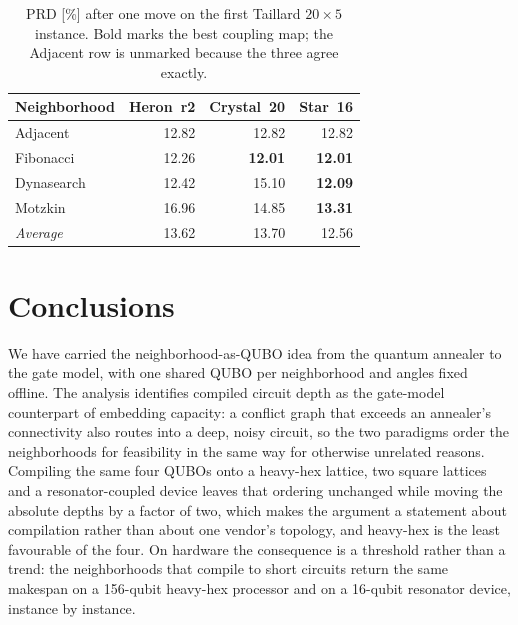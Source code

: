 \documentclass{svproc}
\newcommand{\rev}[1]{{\color{blue}#1}}
\newcommand{\rev}[1]{#1}
\begin{document}
\begin{table}[htb]
\centering
\caption{PRD [\%] after one move on the first Taillard $20\times5$ instance.
  Bold marks the best coupling map; the Adjacent row is unmarked because the
  three agree exactly.}
\label{tab:arch}
\footnotesize
\begin{tabular*}{\textwidth}{@{\extracolsep{\fill}}lrrr@{}}
\toprule
Neighborhood & Heron~r2 & Crystal~20 & Star~16 \\
\midrule
Adjacent    & 12.82 & 12.82 & 12.82 \\
Fibonacci   & 12.26 & \textbf{12.01} & \textbf{12.01} \\
Dynasearch  & 12.42 & 15.10 & \textbf{12.09} \\
Motzkin     & 16.96 & 14.85 & \textbf{13.31} \\
\midrule
\emph{Average} & 13.62 & 13.70 & 12.56 \\
\bottomrule
\end{tabular*}
\end{table}

\section{Conclusions}
\label{sec:conclusions}
We have carried the neighborhood-as-QUBO idea from the quantum annealer to the
gate model\rev{, with one shared QUBO per neighborhood and angles fixed offline}. The analysis identifies compiled circuit depth as the
gate-model counterpart of embedding capacity: a conflict graph that exceeds an
annealer's connectivity also routes into a deep, noisy circuit, so the two
paradigms order the neighborhoods for feasibility in the same way for
otherwise unrelated reasons. Compiling the same four QUBOs onto a heavy-hex
lattice, two square lattices and a resonator-coupled device leaves that
ordering unchanged while moving the absolute depths by a factor of two, which
makes the argument a statement about compilation rather than about one
vendor's topology, and heavy-hex is the least favourable of the four. On
hardware the consequence is a threshold rather than a trend: the neighborhoods
that compile to short circuits return the same makespan on a 156-qubit
heavy-hex processor and on a 16-qubit resonator device, instance by instance.
\end{document}
